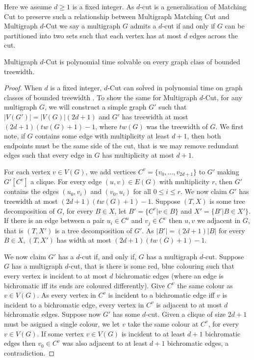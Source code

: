 \documentclass[a4paper,UKenglish,cleveref, autoref,thm-restate]{lipics-v2021}
\begin{document}
Here we assume $d \geq 1$ is a fixed integer. As $d$-cut is a generalisation of {\sc Matching Cut} to preserve such a relationship between {\sc Multigraph Matching Cut} and {\sc Multigraph $d$-Cut} we say a multigraph $G$ admits a $d$-cut if and only if $G$ can be partitioned into two sets such that each vertex has at most $d$ edges across the cut.

\begin{proposition}
{\sc Multigraph $d$-Cut} is polynomial time solvable on every graph class of bounded treewidth.
\label{prop:multi-d-cut-bounded-treewidth}
\end{proposition}
\begin{proof}
    When $d$ is a fixed integer, {\sc $d$-Cut} can solved in polynomial time on graph classes of bounded treewidth \cite{GS21}. To show the same for {\sc Multigraph $d$-Cut}, for any multigraph $G$, we will construct a simple graph $G'$ such that $|V(G')| = |V(G)|(2d+1)$ and $G'$ has treewidth at most $(2d+1)(\mathit{tw}(G)+1)-1$, where $\mathit{tw}(G)$ was the treewidth of $G$. We first note, if $G$ contains some edge with multiplicity at least $d+1$, then both endpoints must be the same side of the cut, that is we may remove redundant edges such that every edge in $G$ has multiplicity at most $d+1$.
    
    For each vertex $v \in V(G)$, we add vertices $C^v = \{v_0, \ldots,v_{2d+1}\}$ to $G'$ making $G'[C^v]$ a clique. For every edge $(u,v) \in E(G)$ with multiplicity $r$, then $G'$ contains the edges $(u_0,v_i)$ and $(v_0,u_i)$ for all $0 \leq i \leq r$. We now claim $G'$ has treewidth at most $(2d+1)(\mathit{tw}(G)+1)-1$. Suppose $(T,X)$ is some tree decomposition of $G$, for every $B \in X$, let  $B' = \{ C^v | v \in B\}$ and $X' = \{ B' | B \in X'\}$. If there is an edge between a pair $u_i \in C^u$ and $v_j \in C^v$ then $u,v$ we adjacent in $G$, that is $(T,X')$ is a tree decomposition of $G'$. As $| B'| =  (2d+1)|B|$ for every $B \in X$, $(T,X')$ has width at most $(2d+1)(tw(G)+1)-1$.

    We now claim $G'$ has a $d$-cut if, and only if, $G$ has a multigraph $d$-cut. Suppose $G$ has a multigraph $d$-cut, that is there is some red, blue colouring such that every vertex is incident to at most $d$ bichromatic edges (where an edge is bichromatic iff its ends are coloured differently). Give $C^v$ the same colour as $v \in V(G)$. As every vertex in $C^v$ is incident to a bichromatic edge iff $v$ is incident to a bichromatic edge, every vertex in $C^v$ is adjacent to at most $d$ bichromatic edges. Suppose now $G'$ has some $d$-cut. Given a clique of size $2d+1$ must be asigned a single colour, we let $v$ take the same colour at $C^v$, for every $v \in V(G)$. If some vertex $v \in V(G)$ is incident to at least $d+1$ bichromatic edges then $v_0 \in C^v$ was also adjacent to at least $d+1$ bichromatic edges, a contradiction. %
\end{proof}
\end{document}
